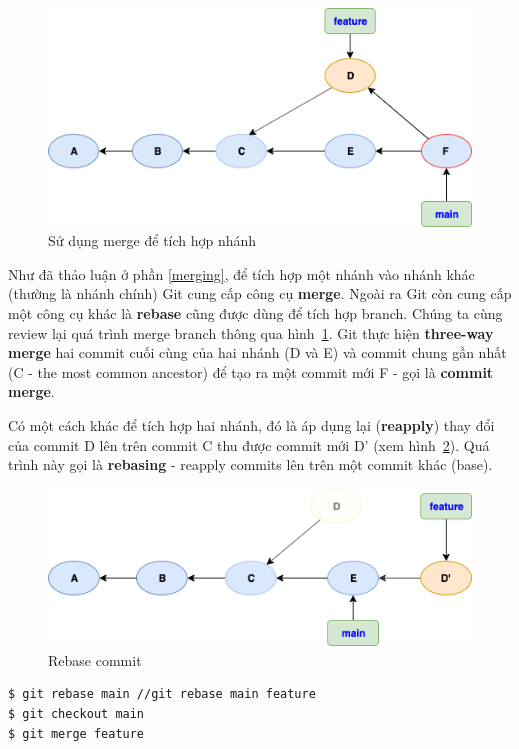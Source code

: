 \documentclass[a4paper, 11pt]{article}
\begin{document}
\begin{figure}
\centering
\includegraphics[scale=0.6]{git-merge-commit.png}
\caption{Sử dụng merge để tích hợp nhánh}
\label{fig:merge-integration}
\end{figure}

Như đã thảo luận ở phần \ref{merging}, để tích hợp một nhánh vào nhánh khác (thường là nhánh chính) Git cung cấp công cụ \textbf{merge}. Ngoài ra Git còn cung cấp một công cụ khác là \textbf{rebase} cũng được dùng để tích hợp branch. Chúng ta cùng review lại quá trình merge branch thông qua hình~\ref{fig:merge-integration}. Git thực hiện \textbf{three-way merge} hai commit cuối cùng của hai nhánh (D và E) và commit chung gần nhất (C - the most common ancestor) để tạo ra một commit mới F - gọi là \textbf{commit merge}.

Có một cách khác để tích hợp hai nhánh, đó là áp dụng lại (\textbf{reapply}) thay đổi của commit D lên trên commit C thu được commit mới D' (xem hình~\ref{fig:git-rebase}). Quá trình này gọi là \textbf{rebasing} - reapply commits lên trên một commit khác (base).

\begin{figure}
\centering
\includegraphics[scale=0.6]{git-rebase.png}
\caption{Rebase commit}
\label{fig:git-rebase}
\end{figure}

\begin{lstlisting}[language=bash]
$ git rebase main //git rebase main feature
$ git checkout main
$ git merge feature
\end{lstlisting}
\end{document}
